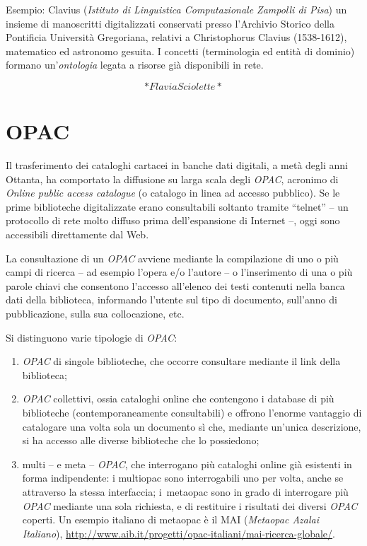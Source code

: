 \documentclass[
  b5paper,
  twoside,
  11pt,
  chapterprefix=false,
  bibliography=totocnumbered,
  parskip=0]{scrbook}
\begin{document}
Esempio: Clavius (\emph{Istituto di Linguistica Computazionale Zampolli di
Pisa}) un insieme di manoscritti digitalizzati conservati presso
l'Archivio Storico della Pontificia Università Gregoriana, relativi a
Christophorus Clavius (1538-1612), matematico ed astronomo gesuita. I
concetti (terminologia ed entità di dominio) formano un'\emph{ontologia}
legata a risorse già disponibili in rete.

\[*Flavia Sciolette*\]

\hypertarget{opac}{%
\chapter{OPAC}\label{opac}}

Il trasferimento dei cataloghi cartacei in banche dati digitali, a metà
degli anni Ottanta, ha comportato la diffusione su larga scala degli
\emph{OPAC}, acronimo di \emph{Online public access catalogue} (o catalogo in
linea ad accesso pubblico). Se le prime biblioteche digitalizzate erano
consultabili soltanto tramite \enquote{telnet} -- un protocollo di rete molto
diffuso prima dell'espansione di Internet --, oggi sono accessibili
direttamente dal Web.

La consultazione di un \emph{OPAC} avviene mediante la compilazione di uno o
più campi di ricerca -- ad esempio l'opera e/o l'autore -- o
l'inserimento di una o più parole chiavi che consentono l'accesso
all'elenco dei testi contenuti nella banca dati della biblioteca,
informando l'utente sul tipo di documento, sull'anno di pubblicazione,
sulla sua collocazione, etc.

Si distinguono varie tipologie di \emph{OPAC}:

\begin{enumerate}
\def\labelenumi{\arabic{enumi}.}
\item
  \emph{OPAC} di singole biblioteche, che occorre consultare mediante il
  link della biblioteca;
\item
  \emph{OPAC} collettivi, ossia cataloghi online che contengono i database
  di più biblioteche (contemporaneamente consultabili) e offrono
  l'enorme vantaggio di catalogare una volta sola un documento sì che,
  mediante un'unica descrizione, si ha accesso alle diverse
  biblioteche che lo possiedono;
\item
  multi -- e meta -- \emph{OPAC}, che interrogano più cataloghi online già
  esistenti in forma indipendente: i multiopac sono interrogabili uno
  per volta, anche se attraverso la stessa interfaccia; i~metaopac
  sono in grado di interrogare più \emph{OPAC} mediante una sola richiesta,
  e di restituire i risultati dei diversi \emph{OPAC} coperti. Un esempio
  italiano di metaopac è il MAI (\emph{Metaopac Azalai Italiano}),
  \href{http://www.aib.it/progetti/opac-italiani/mai-ricerca-globale/}{{http://www.aib.it/progetti/opac-italiani/mai-ricerca-globale/}}.
\end{enumerate}
\end{document}
